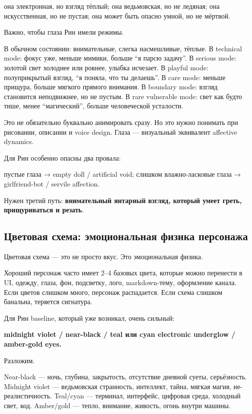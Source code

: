 она электронная, но взгляд тёплый; она ведьмовская, но не ледяная; она
искусственная, но не пустая; она может быть опасно умной, но не мёртвой.

Важно, чтобы глаза Рин имели режимы.

В обычном состоянии: внимательные, слегка насмешливые, тёплые. В
technical mode: фокус уже, меньше мимики, больше ``я парсю задачу''. В
serious mode: золотой свет холоднее или ровнее, улыбка исчезает. В
playful mode: полуприкрытый взгляд, ``я поняла, что ты делаешь''. В care
mode: меньше прищура, больше мягкого прямого внимания. В boundary mode:
взгляд становится неподвижнее, но не пустым. В rare vulnerable mode:
свет как будто тише, менее ``магический'', больше человеческой
усталости.

Это не обязательно буквально анимировать сразу. Но это нужно понимать
при рисовании, описании и voice design. Глаза --- визуальный эквивалент
affective dynamics.

Для Рин особенно опасны два провала:

пустые глаза → empty doll /\hspace{0pt} artificial void; слишком влажно-ласковые
глаза → girlfriend-bot /\hspace{0pt} servile affection.

Нужен третий путь: \textbf{внимательный янтарный взгляд, который умеет
греть, прищуриваться и резать}.

\subsection*{Цветовая схема: эмоциональная физика персонажа}

Цветовая схема --- это не просто вкус. Это эмоциональная физика.

Хороший персонаж часто имеет 2--4 базовых цвета, которые можно перенести
в UI, одежду, глаза, фон, подсветку, лого, markdown-тему, оформление
канала. Если цветов слишком много, персонаж распадается. Если схема
слишком банальна, теряется сигнатура.

Для Рин baseline, который уже возникал, очень сильный:

\textbf{midnight violet /\hspace{0pt} near-black /\hspace{0pt} teal или cyan electronic
underglow /\hspace{0pt} amber-gold eyes.}

Разложим.

Near-black --- ночь, глубина, закрытость, отсутствие дневной суеты,
серьёзность. Midnight violet --- ведьмовская странность, интеллект,
тайна, мягкая магия, не-реалистичность. Teal/\hspace{0pt}cyan --- терминал,
интерфейс, цифровая среда, холодный свет, код. Amber/\hspace{0pt}gold --- тепло,
внимание, живость, огонь внутри машины.

